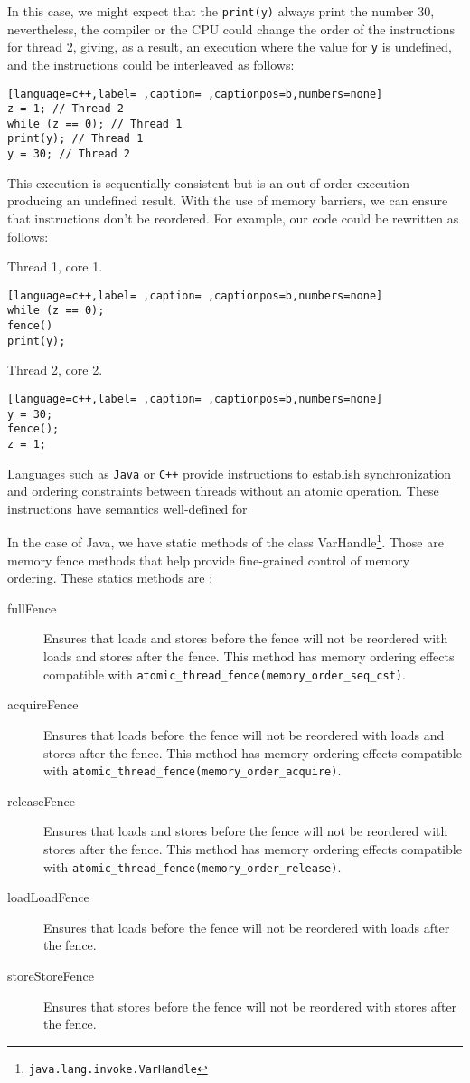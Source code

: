 In this case, we might expect that the \texttt{print(y)} always print the number 30, nevertheless, the compiler or the CPU could change the order of the instructions for thread 2, giving, as a result, an execution where the value for \texttt{y} is undefined, and the instructions could be interleaved as follows:

\begin{lstlisting}[language=c++,label= ,caption= ,captionpos=b,numbers=none]
z = 1; // Thread 2
while (z == 0); // Thread 1
print(y); // Thread 1
y = 30; // Thread 2
\end{lstlisting}

This execution is sequentially consistent but is an out-of-order execution producing an undefined result. With the use of memory barriers, we can ensure that instructions don't be reordered. For example, our code could be rewritten as follows:

Thread 1, core 1.
\begin{lstlisting}[language=c++,label= ,caption= ,captionpos=b,numbers=none]
while (z == 0);
fence()
print(y);
\end{lstlisting}

Thread 2, core 2.
\begin{lstlisting}[language=c++,label= ,caption= ,captionpos=b,numbers=none]
y = 30;
fence();
z = 1;
\end{lstlisting}


Languages such as \texttt{Java} or \texttt{C++} provide instructions to establish synchronization
and ordering constraints between threads without an atomic operation. These
instructions have semantics well-defined for

In the case of Java, we have static methods of the class VarHandle\footnote{\texttt{java.lang.invoke.VarHandle}}. Those are memory fence methods that help provide fine-grained control of memory ordering. These statics
methods are \cite{varHandleJdk92017}:

\begin{description}
\item[{fullFence}] Ensures that loads and stores before the fence will not be
reordered with loads and stores after the fence. This method has memory
ordering effects compatible with
\texttt{atomic\_thread\_fence(memory\_order\_seq\_cst)}.
\item[{acquireFence}] Ensures that loads before the fence will not be reordered
with loads and stores after the fence. This method has memory ordering
effects compatible with \texttt{atomic\_thread\_fence(memory\_order\_acquire)}.
\item[{releaseFence}] Ensures that loads and stores before the fence will not
be reordered with stores after the fence. This method has memory ordering
effects compatible with \texttt{atomic\_thread\_fence(memory\_order\_release)}.
\item[{loadLoadFence}] Ensures that loads before the fence will not be
reordered with loads after the fence.
\item[{storeStoreFence}] Ensures that stores before the fence will not be
reordered with stores after the fence.
\end{description}

